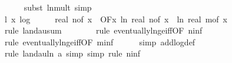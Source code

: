 \begin{isabellebody}
\ \ \ \ \isamarkupfalse%
\ {\isacharparenleft}{\kern0pt}subst\ ln{\isacharunderscore}{\kern0pt}mult{\isacharcomma}{\kern0pt}\ simp{\isacharplus}{\kern0pt}{\isacharparenright}{\kern0pt}\isanewline
\isanewline
\ \ \isamarkupfalse%
\ l{}{\isacharcolon}{\kern0pt}\ {\isachardoublequoteopen}{\isacharparenleft}{\kern0pt}{\isasymlambda}x{\isachardot}{\kern0pt}\ log\ {}\ {\isacharparenleft}{\kern0pt}{}\ {\isacharplus}{\kern0pt}\ {}\ {\isacharasterisk}{\kern0pt}\ real\ {\isacharparenleft}{\kern0pt}n{\isacharunderscore}{\kern0pt}of\ x{\isacharparenright}{\kern0pt}{\isacharparenright}{\kern0pt}{\isacharparenright}{\kern0pt}\ {\isasymin}\ O{\isacharbrackleft}{\kern0pt}{\isacharquery}{\kern0pt}F{\isacharbrackright}{\kern0pt}{\isacharparenleft}{\kern0pt}{\isasymlambda}x{\isachardot}{\kern0pt}\ ln\ {\isacharparenleft}{\kern0pt}real\ {\isacharparenleft}{\kern0pt}n{\isacharunderscore}{\kern0pt}of\ x{\isacharparenright}{\kern0pt}{\isacharparenright}{\kern0pt}\ {\isacharplus}{\kern0pt}\ ln\ {\isacharparenleft}{\kern0pt}real\ {\isacharparenleft}{\kern0pt}m{\isacharunderscore}{\kern0pt}of\ x{\isacharparenright}{\kern0pt}{\isacharparenright}{\kern0pt}{\isacharparenright}{\kern0pt}{\isachardoublequoteclose}\isanewline
\ \ \ \ \isamarkupfalse%
\ {\isacharparenleft}{\kern0pt}rule\ landau{\isacharunderscore}{\kern0pt}sum{\isacharunderscore}{\kern0pt}{}{\isacharparenright}{\kern0pt}\isanewline
\ \ \ \ \ \ \isamarkupfalse%
\ {\isacharparenleft}{\kern0pt}rule\ eventually{\isacharunderscore}{\kern0pt}ln{\isacharunderscore}{\kern0pt}ge{\isacharunderscore}{\kern0pt}iff{\isacharbrackleft}{\kern0pt}OF\ n{\isacharunderscore}{\kern0pt}inf{\isacharbrackright}{\kern0pt}{\isacharparenright}{\kern0pt}\isanewline
\ \ \ \ \ \isamarkupfalse%
\ {\isacharparenleft}{\kern0pt}rule\ eventually{\isacharunderscore}{\kern0pt}ln{\isacharunderscore}{\kern0pt}ge{\isacharunderscore}{\kern0pt}iff{\isacharbrackleft}{\kern0pt}OF\ m{\isacharunderscore}{\kern0pt}inf{\isacharbrackright}{\kern0pt}{\isacharparenright}{\kern0pt}\isanewline
\ \ \ \ \isamarkupfalse%
\ {\isacharparenleft}{\kern0pt}simp\ add{\isacharcolon}{\kern0pt}log{\isacharunderscore}{\kern0pt}def{\isacharparenright}{\kern0pt}\isanewline
\ \ \ \ \isamarkupfalse%
\ {\isacharparenleft}{\kern0pt}rule\ landau{\isacharunderscore}{\kern0pt}ln{\isacharunderscore}{\kern0pt}{}{\isacharbrackleft}{\kern0pt}\ a{\isacharequal}{\kern0pt}{\isachardoublequoteopen}{}{\isachardoublequoteclose}{\isacharbrackright}{\kern0pt}{\isacharcomma}{\kern0pt}\ simp{\isacharcomma}{\kern0pt}\ simp{\isacharcomma}{\kern0pt}\ rule\ n{\isacharunderscore}{\kern0pt}inf{\isacharparenright}{\kern0pt}\isanewline

\end{isabellebody}
